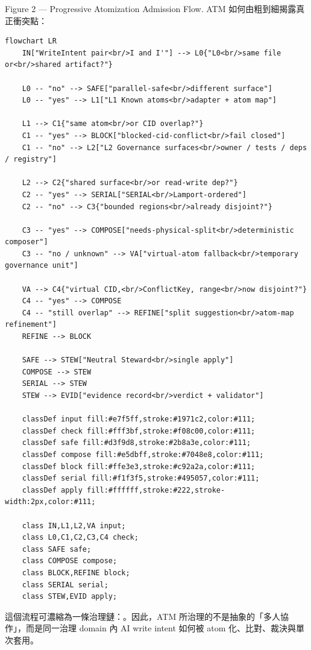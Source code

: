 \documentclass[a4paper,fontset=none]{ctexart}
\begin{document}
Figure 2 --- Progressive Atomization Admission Flow. ATM 如何由粗到細揭露真正衝突點：

\begin{Verbatim}[breaklines=true,fontsize=\footnotesize]
flowchart LR
    IN["WriteIntent pair<br/>I and I'"] --> L0{"L0<br/>same file or<br/>shared artifact?"}

    L0 -- "no" --> SAFE["parallel-safe<br/>different surface"]
    L0 -- "yes" --> L1["L1 Known atoms<br/>adapter + atom map"]

    L1 --> C1{"same atom<br/>or CID overlap?"}
    C1 -- "yes" --> BLOCK["blocked-cid-conflict<br/>fail closed"]
    C1 -- "no" --> L2["L2 Governance surfaces<br/>owner / tests / deps / registry"]

    L2 --> C2{"shared surface<br/>or read-write dep?"}
    C2 -- "yes" --> SERIAL["SERIAL<br/>Lamport-ordered"]
    C2 -- "no" --> C3{"bounded regions<br/>already disjoint?"}

    C3 -- "yes" --> COMPOSE["needs-physical-split<br/>deterministic composer"]
    C3 -- "no / unknown" --> VA["virtual-atom fallback<br/>temporary governance unit"]

    VA --> C4{"virtual CID,<br/>ConflictKey, range<br/>now disjoint?"}
    C4 -- "yes" --> COMPOSE
    C4 -- "still overlap" --> REFINE["split suggestion<br/>atom-map refinement"]
    REFINE --> BLOCK

    SAFE --> STEW["Neutral Steward<br/>single apply"]
    COMPOSE --> STEW
    SERIAL --> STEW
    STEW --> EVID["evidence record<br/>verdict + validator"]

    classDef input fill:#e7f5ff,stroke:#1971c2,color:#111;
    classDef check fill:#fff3bf,stroke:#f08c00,color:#111;
    classDef safe fill:#d3f9d8,stroke:#2b8a3e,color:#111;
    classDef compose fill:#e5dbff,stroke:#7048e8,color:#111;
    classDef block fill:#ffe3e3,stroke:#c92a2a,color:#111;
    classDef serial fill:#f1f3f5,stroke:#495057,color:#111;
    classDef apply fill:#ffffff,stroke:#222,stroke-width:2px,color:#111;

    class IN,L1,L2,VA input;
    class L0,C1,C2,C3,C4 check;
    class SAFE safe;
    class COMPOSE compose;
    class BLOCK,REFINE block;
    class SERIAL serial;
    class STEW,EVID apply;
\end{Verbatim}

這個流程可濃縮為一條治理鏈：\texttt{}。因此，ATM 所治理的不是抽象的「多人協作」，而是同一治理 domain 內 AI write intent 如何被 atom 化、比對、裁決與單次套用。
\end{document}
